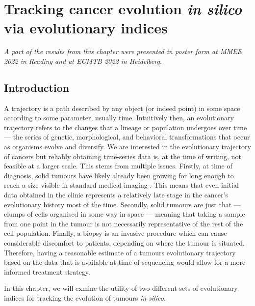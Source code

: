 \chapter{Tracking cancer evolution \textit{in silico} via evolutionary indices}\label{chapter:trajectories}
\textit{A part of the results from this chapter were presented in poster form at MMEE 2022 in Reading and at ECMTB 2022 in Heidelberg.}

\section{Introduction}
A trajectory is a path described by any object (or indeed point) in some space according to some parameter, usually time.  Intuitively then, an evolutionary trajectory refers to the changes that a lineage or population undergoes over time --- the series of genetic, morphological, and behavioral transformations that occur as organisms evolve and diversify. We are interested in the evolutionary trajectory of cancers but reliably obtaining time-series data is, at the time of writing, not feasible at a larger scale. This stems from multiple issues. Firstly, at time of diagnosis, solid tumours have likely already been growing for long enough to reach a size visible in standard medical imaging \cite{patrone_how_2011}. This means that even initial data obtained in the clinic represents a relatively late stage in the cancer's evolutionary history most of the time. Secondly, solid tumours are just that --- clumps of cells organised in some way in space --- meaning that taking a sample from one point in the tumour is not necessarily representative of the rest of the cell population. Finally, a biopsy is an invasive procedure which can cause considerable discomfort to patients, depending on where the tumour is situated. Therefore, having a reasonable estimate of a tumours evolutionary trajectory based on the data that is available at time of sequencing would allow for a more informed treatment strategy.\par
In this chapter, we will exmine the utility of two different sets of evolutionary indices for tracking the evolution of tumours \textit{in silico}.

